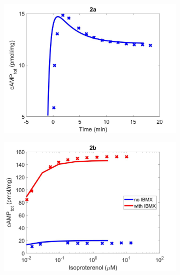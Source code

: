 \documentclass[fleqn,10pt]{physiome}
\begin{document}
\begin{figure}
    \centering
    \begin{subfigure}[b]{0.49\textwidth}
        \centering
        \includegraphics[width=\textwidth]{figures/F2a.jpg}
    \end{subfigure}
    \hfill
    \begin{subfigure}[b]{0.49\textwidth}
        \centering
        \includegraphics[width=\textwidth]{figures/F2b.jpg}
    \end{subfigure}
    \hfill
    \begin{subfigure}[b]{0.49\textwidth}
        \centering

\end{subfigure}
\end{figure}
\end{document}
